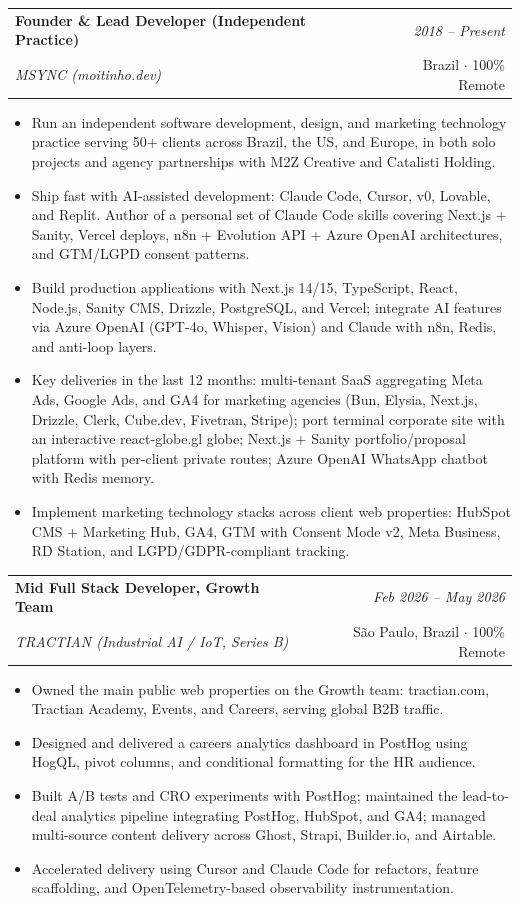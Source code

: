 \documentclass[a4paper,11pt]{article}
\makeatletter
\newcommand{\resumeSubheading}[4]{
\vspace{0.5mm}\item
    \begin{tabular*}{0.98\textwidth}[t]{l@{\extracolsep{\fill}}r}
        \textbf{#1} & \textit{\footnotesize{#4}} \\
        \textit{\footnotesize{#3}} &  \footnotesize{#2}\\
    \end{tabular*}
    \vspace{-2.4mm}
}
\newcommand{\resumeItemListStart}{\begin{justify}\begin{itemize}[leftmargin=3ex, rightmargin=2ex, noitemsep,labelsep=1.2mm,itemsep=0mm]\small}
\newcommand{\resumeItemListEnd}{\end{itemize}\end{justify}\vspace{-2mm}}
\makeatother
\begin{document}
  \resumeSubheading
  {Founder \& Lead Developer (Independent Practice)}{Brazil $\cdot$ 100\% Remote}
  {MSYNC (moitinho.dev)}{2018 -- Present}
  \resumeItemListStart
    \item{Run an independent software development, design, and marketing technology practice serving 50+ clients across Brazil, the US, and Europe, in both solo projects and agency partnerships with M2Z Creative and Catalisti Holding.}
    \item{Ship fast with AI-assisted development: Claude Code, Cursor, v0, Lovable, and Replit. Author of a personal set of Claude Code skills covering Next.js + Sanity, Vercel deploys, n8n + Evolution API + Azure OpenAI architectures, and GTM/LGPD consent patterns.}
    \item{Build production applications with Next.js 14/15, TypeScript, React, Node.js, Sanity CMS, Drizzle, PostgreSQL, and Vercel; integrate AI features via Azure OpenAI (GPT-4o, Whisper, Vision) and Claude with n8n, Redis, and anti-loop layers.}
    \item{Key deliveries in the last 12 months: multi-tenant SaaS aggregating Meta Ads, Google Ads, and GA4 for marketing agencies (Bun, Elysia, Next.js, Drizzle, Clerk, Cube.dev, Fivetran, Stripe); port terminal corporate site with an interactive react-globe.gl globe; Next.js + Sanity portfolio/proposal platform with per-client private routes; Azure OpenAI WhatsApp chatbot with Redis memory.}
    \item{Implement marketing technology stacks across client web properties: HubSpot CMS + Marketing Hub, GA4, GTM with Consent Mode v2, Meta Business, RD Station, and LGPD/GDPR-compliant tracking.}
  \resumeItemListEnd

  \resumeSubheading
  {Mid Full Stack Developer, Growth Team}{São Paulo, Brazil $\cdot$ 100\% Remote}
  {TRACTIAN (Industrial AI / IoT, Series B)}{Feb 2026 -- May 2026}
  \resumeItemListStart
    \item{Owned the main public web properties on the Growth team: tractian.com, Tractian Academy, Events, and Careers, serving global B2B traffic.}
    \item{Designed and delivered a careers analytics dashboard in PostHog using HogQL, pivot columns, and conditional formatting for the HR audience.}
    \item{Built A/B tests and CRO experiments with PostHog; maintained the lead-to-deal analytics pipeline integrating PostHog, HubSpot, and GA4; managed multi-source content delivery across Ghost, Strapi, Builder.io, and Airtable.}
    \item{Accelerated delivery using Cursor and Claude Code for refactors, feature scaffolding, and OpenTelemetry-based observability instrumentation.}
  \resumeItemListEnd
\end{document}
